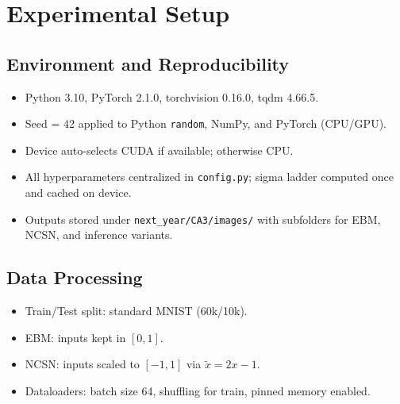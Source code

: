 \documentclass[conference]{IEEEtran}
\begin{document}
\section{Experimental Setup}
\subsection{Environment and Reproducibility}
\begin{itemize}[leftmargin=*]
    \item Python 3.10, PyTorch 2.1.0, torchvision 0.16.0, tqdm 4.66.5.
    \item Seed = 42 applied to Python \texttt{random}, NumPy, and PyTorch (CPU/GPU).
    \item Device auto-selects CUDA if available; otherwise CPU.
    \item All hyperparameters centralized in \texttt{config.py}; sigma ladder computed once and cached on device.
    \item Outputs stored under \texttt{next\_year/CA3/images/} with subfolders for EBM, NCSN, and inference variants.
\end{itemize}

\subsection{Data Processing}
\begin{itemize}[leftmargin=*]
    \item Train/Test split: standard MNIST (60k/10k).
    \item EBM: inputs kept in $[0,1]$.
    \item NCSN: inputs scaled to $[-1,1]$ via $\tilde{x} = 2x - 1$.
    \item Dataloaders: batch size 64, shuffling for train, pinned memory enabled.
\end{itemize}
\end{document}
